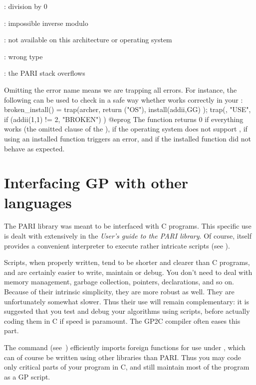 : division by 0

: impossible inverse modulo

: not available on this architecture or operating system

: wrong type

: the PARI stack overflows

\noindent Omitting the error name means we are trapping all errors. For
instance, the following can be used to check in a safe way whether
 works correctly in your :
\bprog
broken_install() =
{
  trap(archer, return ("OS"),
    install(addii,GG)
  );
  trap(, "USE",
    if (addii(1,1) != 2, "BROKEN")
  )
}
@eprog
\noindent The function returns 0 if everything works (the omitted 
clause of the ),  if the operating system does not support
,  if using an installed function triggers an error,
and  if the installed function did not behave as expected.

\section{Interfacing GP with other languages}
\noindent
The PARI library was meant to be interfaced with C programs. This specific
use is dealt with extensively in the \emph{User's guide to the PARI library}.
Of course,  itself provides a convenient  interpreter to execute
rather intricate scripts (see ).

Scripts, when properly written, tend to be shorter and clearer than C
programs, and are certainly easier to write, maintain or debug. You don't
need to deal with memory management, garbage collection, pointers,
declarations, and so on. Because of their intrinsic simplicity, they are more
robust as well. They are unfortunately somewhat slower. Thus their use will
remain complementary: it is suggested that you test and debug your algorithms
using scripts, before actually coding them in C if speed is paramount.
The GP2C compiler often eases this part.

The  command (see~) efficiently imports
foreign functions for use under , which can of course be written
using other libraries than PARI. Thus you may code only critical parts
of your program in C, and still maintain most of the program as a GP script.

